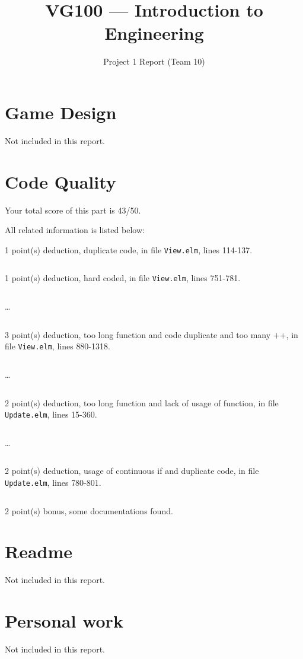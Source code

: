 \documentclass{article}
\title{VG100 --- Introduction to\\ Engineering}
\subtitle{Project 1 Report (Team 10)}
\begin{document}
\maketitle

\section{Game Design}

Not included in this report.

\section{Code Quality}

Your total score of this part is 43/50. \medskip

All related information is listed below: \medskip

1 point(s) {\color{red}deduction}, duplicate code, in file {\color{blue}\texttt{View.elm}}, lines {\color{blue}114-137}.

\inputminted[firstline=114,lastline=137]{elm}{View.elm}

1 point(s) {\color{red}deduction}, hard coded, in file {\color{blue}\texttt{View.elm}}, lines {\color{blue}751-781}.

\inputminted[firstline=751,lastline=760]{elm}{View.elm}

\dots

\inputminted[firstline=772,lastline=781]{elm}{View.elm}

3 point(s) {\color{red}deduction}, too long function and code duplicate and too many ++, in file {\color{blue}\texttt{View.elm}}, lines {\color{blue}880-1318}.

\inputminted[firstline=880,lastline=889]{elm}{View.elm}

\dots

\inputminted[firstline=1309,lastline=1318]{elm}{View.elm}

2 point(s) {\color{red}deduction}, too long function and lack of usage of function, in file {\color{blue}\texttt{Update.elm}}, lines {\color{blue}15-360}.

\inputminted[firstline=15,lastline=24]{elm}{Update.elm}

\dots

\inputminted[firstline=351,lastline=360]{elm}{Update.elm}

2 point(s) {\color{red}deduction}, usage of continuous if and duplicate code, in file {\color{blue}\texttt{Update.elm}}, lines {\color{blue}780-801}.

\inputminted[firstline=780,lastline=801]{elm}{Update.elm}

2 point(s) {\color{red}bonus}, some documentations found.\medskip



\newpage

\section{Readme}

Not included in this report.

\section{Personal work}

Not included in this report.


\newpage
\end{document}
